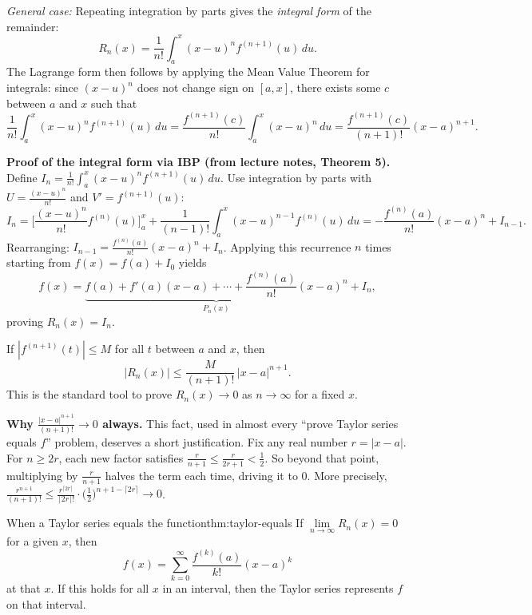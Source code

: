 \smallskip
\emph{General case:} Repeating integration by parts gives the \emph{integral form} of the remainder:
\[
R_n(x)=\frac{1}{n!}\int_a^x (x-u)^n f^{(n+1)}(u)\,du.
\]
The Lagrange form then follows by applying the Mean Value Theorem for integrals:
since $(x-u)^n$ does not change sign on $[a,x]$, there exists some $c$ between $a$ and $x$ such that
\[
\frac{1}{n!}\int_a^x (x-u)^n f^{(n+1)}(u)\,du
=\frac{f^{(n+1)}(c)}{n!}\int_a^x (x-u)^n\,du
=\frac{f^{(n+1)}(c)}{(n+1)!}(x-a)^{n+1}.
\]

\smallskip
\noindent\textbf{Proof of the integral form via IBP (from lecture notes, Theorem 5).}
Define $I_n=\frac{1}{n!}\int_a^x (x-u)^n f^{(n+1)}(u)\,du$.
Use integration by parts with $U=\frac{(x-u)^n}{n!}$ and $V'=f^{(n+1)}(u)$:
\[
I_n = \biggl[\frac{(x-u)^n}{n!}f^{(n)}(u)\biggr]_a^x + \frac{1}{(n-1)!}\int_a^x (x-u)^{n-1}f^{(n)}(u)\,du
= -\frac{f^{(n)}(a)}{n!}(x-a)^n + I_{n-1}.
\]
Rearranging: $I_{n-1}=\frac{f^{(n)}(a)}{n!}(x-a)^n + I_n$.
Applying this recurrence $n$ times starting from $f(x)=f(a)+I_0$ yields
\[
f(x)=\underbrace{f(a)+f'(a)(x-a)+\cdots+\frac{f^{(n)}(a)}{n!}(x-a)^n}_{P_n(x)}+I_n,
\]
proving $R_n(x)=I_n$.

\begin{keyformula}[title={Key Formula: Error bound for Taylor approximation}]
If $|f^{(n+1)}(t)|\le M$ for all $t$ between $a$ and $x$, then
\[
|R_n(x)|\le \frac{M}{(n+1)!}\,|x-a|^{n+1}.
\]
This is the standard tool to prove $R_n(x)\to 0$ as $n\to\infty$ for a fixed $x$.
\end{keyformula}

\noindent\textbf{Why $\frac{|x-a|^{n+1}}{(n+1)!}\to 0$ always.}
This fact, used in almost every ``prove Taylor series equals $f$'' problem, deserves a short justification.
Fix any real number $r=|x-a|$. For $n\ge 2r$, each new factor satisfies
$\frac{r}{n+1}\le \frac{r}{2r+1}<\frac{1}{2}$.
So beyond that point, multiplying by $\frac{r}{n+1}$ halves the term each time, driving it to $0$.
More precisely, $\frac{r^{n+1}}{(n+1)!}\le \frac{r^{\lceil 2r\rceil}}{\lceil 2r\rceil!}\cdot\bigl(\tfrac12\bigr)^{n+1-\lceil 2r\rceil}\to 0$.

\begin{theorem}{When a Taylor series equals the function}{thm:taylor-equals}
If $\lim\limits_{n\to\infty} R_n(x)=0$ for a given $x$, then
\[
f(x)=\sum_{k=0}^{\infty}\frac{f^{(k)}(a)}{k!}(x-a)^k
\]
at that $x$. If this holds for all $x$ in an interval, then the Taylor series represents $f$ on that interval.
\end{theorem}

